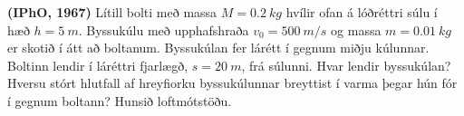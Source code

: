 \ifdefined \wholebook \else\documentclass[oneside]{book}\usepackage{EdlBook}\graphicspath{{figures/}}
\begin{document}
\begin{enumerate}[label = \textbf{Dæmi \thechapter.\arabic*.}]
\begin{minipage}{\linewidth}
\item \textbf{(IPhO, 1967)} Lítill bolti með massa $M = \SI{0.2}{kg}$ hvílir ofan á lóðréttri súlu í hæð $h = \SI{5}{m}$. Byssukúlu með upphafshraða $v_0 = \SI{500}{m/s}$ og massa $m = \SI{0.01}{kg}$ er skotið í átt að boltanum. Byssukúlan fer lárétt í gegnum miðju kúlunnar. Boltinn lendir í láréttri fjarlægð, $s = \SI{20}{m}$, frá súlunni. Hvar lendir byssukúlan? Hversu stórt hlutfall af hreyfiorku byssukúlunnar breyttist í varma þegar hún fór í gegnum boltann? Hunsið loftmótstöðu.  

\end{minipage}

\end{enumerate}


\ifdefined \wholebook \else
 \printindex
\end{document}
